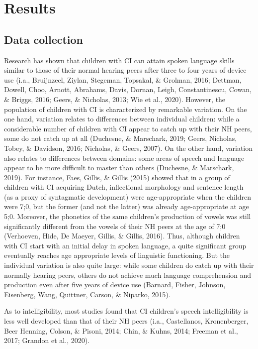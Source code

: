 \section{Results}
%
\subsection{Data collection}

Research has shown that children with CI can attain spoken language skills similar to
those of their normal hearing peers after three to four years of device use (i.a., Bruijnzeel, Ziylan, Stegeman, Topsakal, \& Grolman, 2016; Dettman, Dowell, Choo, Arnott, Abrahams, Davis, Dornan, Leigh, Constantinescu, Cowan, \& Briggs, 2016; Geers, \& Nicholas,
2013; Wie et al., 2020). However, the population of children with CI is characterized by remarkable variation. On the one hand, variation relates to differences between individual children: while a considerable number of children with CI appear to catch up with their NH peers, some do not catch up at all (Duchesne, \& Marschark, 2019; Geers, Nicholas, Tobey, \& Davidson, 2016; Nicholas, \& Geers, 2007). On the other hand, variation also relates to differences between domains: some areas of speech and language appear to be more difficult to master than others (Duchesne, \& Marschark, 2019). For instance, Faes, Gillis, \& Gillis (2015) showed that in a group of children with CI acquiring Dutch, inflectional morphology and sentence length (as a proxy of syntagmatic development) were age-appropriate when the children were 7;0, but the former (and not the latter) was already age-appropriate at age 5;0. Moreover, the phonetics of the same children’s production of vowels was still significantly different from the vowels of their NH peers
at the age of 7;0 (Verhoeven, Hide, De Maeyer, Gillis, \& Gillis, 2016). Thus, although
children with CI start with an initial delay in spoken language, a quite significant group
eventually reaches age appropriate levels of linguistic functioning. But the individual
variation is also quite large: while some children do catch up with their normally hearing
peers, others do not achieve much language comprehension and production even after five years of device use (Barnard, Fisher, Johnson, Eisenberg, Wang, Quittner, Carson, \&
Niparko, 2015).



As to intelligibility, most studies found that CI children’s speech intelligibility is less
well developed than that of their NH peers (i.a., Castellanos, Kronenberger, Beer Henning, Colson, \& Pisoni, 2014; Chin, \& Kuhns, 2014; Freeman et al., 2017; Grandon et al., 2020). 